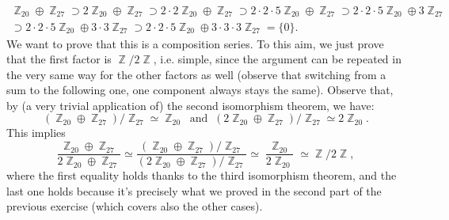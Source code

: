 \documentclass[12pt,a4paper]{report}
\theoremstyle{definition}
\theoremstyle{num.custom-title}
\DeclareMathOperator{\Z}{\mathbb{Z}}
\begin{document}
\begin{multline*}
\Z_{20} \oplus \Z_{27} \supset 2\Z_{20} \oplus \Z_{27} \supset 2 \cdot 2\Z_{20} \oplus \Z_{27} \supset 2 \cdot 2 \cdot 5 \Z_{20} \oplus \Z_{27} \supset 2 \cdot 2 \cdot 5 \Z_{20} \oplus 3 \Z_{27} \\
\supset 2 \cdot 2 \cdot 5 \Z_{20} \oplus 3 \cdot 3 \Z_{27} \supset 2 \cdot 2 \cdot 5 \Z_{20} \oplus 3 \cdot 3 \cdot 3 \Z_{27} = \{0\}.
\end{multline*}
We want to prove that this is a composition series. To this aim, we just prove that the first factor is $\Z/2\Z$, i.e. simple, since the argument can be repeated in the very same way for the other factors as well (observe that switching from a sum to the following one, one component always stays the same). Observe that, by (a very trivial application of) the second isomorphism theorem, we have:
\[
(\Z_{20} \oplus \Z_{27}) / \Z_{27} \simeq \Z_{20} \ \text{ and } \ (2\Z_{20} \oplus \Z_{27}) / \Z_{27} \simeq 2\Z_{20}.
\]
This implies
\[
\frac{\Z_{20} \oplus \Z_{27}}{2\Z_{20} \oplus \Z_{27}} \simeq \frac{(\Z_{20} \oplus \Z_{27}) / \Z_{27}}{(2\Z_{20} \oplus \Z_{27}) / \Z_{27}} \simeq \frac{\Z_{20}}{2\Z_{20}} \simeq \Z/2\Z,
\]
where the first equality holds thanks to the third isomorphism theorem, and the last one holds because it's precisely what we proved in the second part of the previous exercise (which covers also the other cases).
\end{document}

